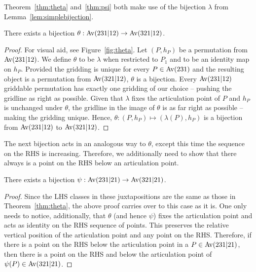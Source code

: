 \documentclass[12pt, a4paper, twoside]{report}
\begin{document}
Theorem~\ref{thm:theta} and~\ref{thm:psi} both make use of the bijection $\lambda$ from Lemma~\ref{lem:simplebijection}. 
\begin{theorem}
\label{thm:theta}
There exists a bijection $\theta: \mathrm{Av}(231|12) \rightarrow \mathrm{Av}(321|12)$. 
\end{theorem}
\begin{proof}
For visual aid, see Figure~\ref{fig:theta}. Let $(P,h_P)$ be a permutation from $\mathrm{Av}(231|12)$. We define $\theta$ to be $\lambda$ when restricted to $P_1$ and to be an identity map on $h_P$. Provided the gridding is unique for every $P \in \mathrm{Av}(231)$ and the resulting object is a permutation from $\mathrm{Av}(321|12)$, $\theta$ is a bijection. Every $\mathrm{Av}(231|12)$ griddable permutation has exactly one gridding of our choice -- pushing the gridline as right as possible. Given that $\lambda$ fixes the articulation point of $P$ and $h_P$ is unchanged under $\theta$, the gridline in the image of $\theta$ is as far right as possible -- making the gridding unique. Hence, $\theta: (P,h_P) \mapsto (\lambda(P),h_P)$ is a bijection from $\mathrm{Av}(231|12)$ to $\mathrm{Av}(321|12)$. 
\end{proof}

The next bijection acts in an analogous way to $\theta$, except this time the sequence on the RHS is increasing. Therefore, we additionally need to show that there always is a point on the RHS below an articulation point.

\begin{theorem}
\label{thm:psi}
There exists a bijection $\psi: \mathrm{Av}(231|21) \rightarrow \mathrm{Av}(321|21)$. 
\end{theorem}
\begin{proof}
Since the LHS classes in these juxtapositions are the same as those in Theorem~\ref{thm:theta}, the above proof carries over to this case as it is. One only needs to notice, additionally, that $\theta$ (and hence $\psi$) fixes the articulation point and acts as identity on the RHS sequence of points. This preserves the relative vertical position of the articulation point and any point on the RHS. Therefore, if there is a point on the RHS below the articulation point in a $P \in \mathrm{Av}(231|21)$, then there is a point on the RHS and below the articulation point of $\psi(P) \in \mathrm{Av}(321|21)$. 
\end{proof}
\end{document}
